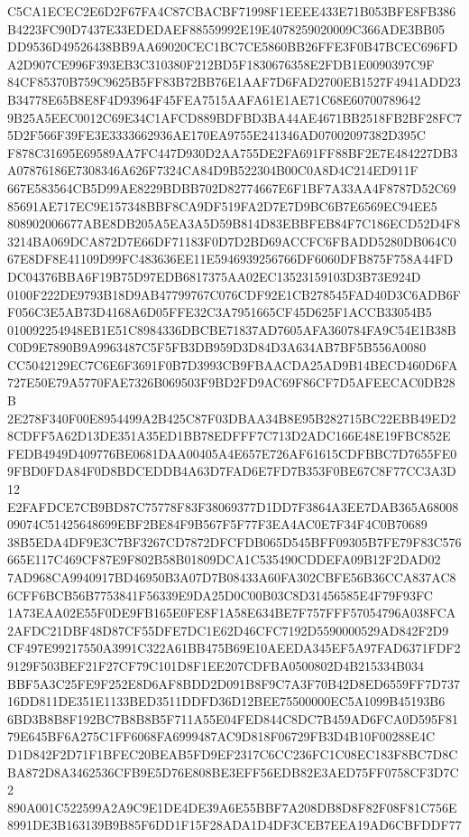 \documentclass[UTF8,fontset=fandol,zihao=-4,a4paper]{ctexart}
\begin{document}
{{C5CA1ECEC2E6D2F67FA4C87CBACBF71998F1EEEE433E71B053BFE8FB386B4223FC90D7437E33EDEDAEF88559992E19E4078259020009C366ADE3BB05
DD9536D49526438BB9AA69020CEC1BC7CE5860BB26FFE3F0B47BCEC696FDA2D907CE996F393EB3C310380F212BD5F1830676358E2FDB1E0090397C9F
84CF85370B759C9625B5FF83B72BB76E1AAF7D6FAD2700EB1527F4941ADD23B34778E65B8E8F4D93964F45FEA7515AAFA61E1AE71C68E60700789642
9B25A5EEC0012C69E34C1AFCD889BDFBD3BA44AE4671BB2518FB2BF28FC75D2F566F39FE3E3333662936AE170EA9755E241346AD07002097382D395C
F878C31695E69589AA7FC447D930D2AA755DE2FA691FF88BF2E7E484227DB3A07876186E7308346A626F7324CA84D9B522304B00C0A8D4C214ED911F
667E583564CB5D99AE8229BDBB702D82774667E6F1BF7A33AA4F8787D52C6985691AE717EC9E157348BBF8CA9DF519FA2D7E7D9BC6B7E6569EC94EE5
808902006677ABE8DB205A5EA3A5D59B814D83EBBFEB84F7C186ECD52D4F83214BA069DCA872D7E66DF71183F0D7D2BD69ACCFC6FBADD5280DB064C0
67E8DF8E41109D99FC483636EE11E5946939256766DF6060DFB875F758A44FDDC04376BBA6F19B75D97EDB6817375AA02EC13523159103D3B73E924D
0100F222DE9793B18D9AB47799767C076CDF92E1CB278545FAD40D3C6ADB6FF056C3E5AB73D4168A6D05FFE32C3A7951665CF45D625F1ACCB33054B5
010092254948EB1E51C8984336DBCBE71837AD7605AFA360784FA9C54E1B38BC0D9E7890B9A9963487C5F5FB3DB959D3D84D3A634AB7BF5B556A0080
CC5042129EC7C6E6F3691F0B7D3993CB9FBAACDA25AD9B14BECD460D6FA727E50E79A5770FAE7326B069503F9BD2FD9AC69F86CF7D5AFEECAC0DB28B
2E278F340F00E8954499A2B425C87F03DBAA34B8E95B282715BC22EBB49ED28CDFF5A62D13DE351A35ED1BB78EDFFF7C713D2ADC166E48E19FBC852E
FEDB4949D409776BE0681DAA00405A4E657E726AF61615CDFBBC7D7655FE09FBD0FDA84F0D8BDCEDDB4A63D7FAD6E7FD7B353F0BE67C8F77CC3A3D12
E2FAFDCE7CB9BD87C75778F83F38069377D1DD7F3864A3EE7DAB365A6800809074C51425648699EBF2BE84F9B567F5F77F3EA4AC0E7F34F4C0B70689
38B5EDA4DF9E3C7BF3267CD7872DFCFDB065D545BFF09305B7FE79F83C576665E117C469CF87E9F802B58B01809DCA1C535490CDDEFA09B12F2DAD02
7AD968CA9940917BD46950B3A07D7B08433A60FA302CBFE56B36CCA837AC86CFF6BCB56B7753841F56339E9DA25D0C00B03C8D31456585E4F79F93FC
1A73EAA02E55F0DE9FB165E0FE8F1A58E634BE7F757FFF57054796A038FCA2AFDC21DBF48D87CF55DFE7DC1E62D46CFC7192D5590000529AD842F2D9
CF497E99217550A3991C322A61BB475B69E10AEEDA345EF5A97FAD6371FDF29129F503BEF21F27CF79C101D8F1EE207CDFBA0500802D4B215334B034
BBF5A3C25FE9F252E8D6AF8BDD2D091B8F9C7A3F70B42D8ED6559FF7D73716DD811DE351E1133BED3511DDFD36D12BEE75500000EC5A1099B45193B6
6BD3B8B8F192BC7B8B8B5F711A55E04FED844C8DC7B459AD6FCA0D595F8179E645BF6A275C1FF6068FA6999487AC9D818F06729FB3D4B10F00288E4C
D1D842F2D71F1BFEC20BEAB5FD9EF2317C6CC236FC1C08EC183F8BC7D8CBA872D8A3462536CFB9E5D76E808BE3EFF56EDB82E3AED75FF0758CF3D7C2
890A001C522599A2A9C9E1DE4DE39A6E55BBF7A208DB8D8F82F08F81C756E8991DE3B163139B9B85F6DD1F15F28ADA1D4DF3CEB7EEA19AD6CBFDDF77
}}
\end{document}
